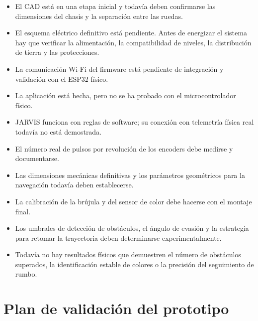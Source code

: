 \documentclass[journal]{IEEEtran}
\begin{document}
\begin{itemize}
    \item El CAD está en una etapa inicial y todavía deben confirmarse las dimensiones del chasis y la separación entre las ruedas.

    \item El esquema eléctrico definitivo está pendiente. Antes de energizar el sistema hay que verificar la alimentación, la compatibilidad de niveles, la distribución de tierra y las protecciones.

    \item La comunicación Wi-Fi del firmware está pendiente de integración y validación con el ESP32 físico.

    \item La aplicación está hecha, pero no se ha probado con el microcontrolador físico.

    \item JARVIS funciona con reglas de software; su conexión con telemetría física real todavía no está demostrada.

    \item El número real de pulsos por revolución de los encoders debe medirse y documentarse.

    \item Las dimensiones mecánicas definitivas y los parámetros geométricos para la navegación todavía deben establecerse.

    \item La calibración de la brújula y del sensor de color debe hacerse con el montaje final.

    \item Los umbrales de detección de obstáculos, el ángulo de evasión y la estrategia para retomar la trayectoria deben determinarse experimentalmente.

    \item Todavía no hay resultados físicos que demuestren el número de obstáculos superados, la identificación estable de colores o la precisión del seguimiento de rumbo.
\end{itemize}


\section{Plan de validación del prototipo}
\end{document}
